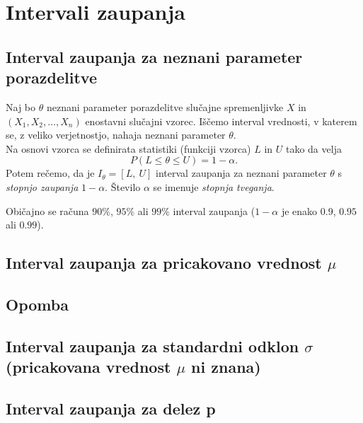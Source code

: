 \section{Intervali zaupanja}
\subsection{Interval zaupanja za neznani parameter porazdelitve}
Naj bo $\theta$ neznani parameter porazdelitve slučajne spremenljivke $X$ in $(X_1,X_2,\ldots , X_n)$ enostavni slučajni vzorec.
Iščemo interval vrednosti, v katerem se, z veliko verjetnostjo, nahaja neznani parameter $\theta$.\\
Na osnovi vzorca se definirata statistiki (funkciji vzorca) $L$ in $U$ tako da velja
\begin{equation*}
P(L\leq \theta \leq U)=1-\alpha.
\end{equation*}
Potem rečemo, da je $I_{\theta}=[L,~U]$ interval zaupanja za neznani parameter $\theta$ s \emph{stopnjo zaupanja} $1-\alpha$. Število $\alpha$ se imenuje \emph{stopnja tveganja}.

Običajno se računa $90\%$, $95\%$ ali $99\%$ interval zaupanja ($1-\alpha$ je enako $0.9$, $0.95$ ali $0.99$).	




\subsection{Interval zaupanja za pricakovano vrednost $\mu$}

\subsection{Opomba}

\subsection{Interval zaupanja za standardni odklon $\sigma$ (pricakovana vrednost $\mu$ ni znana)}

\subsection{Interval zaupanja za delez p}